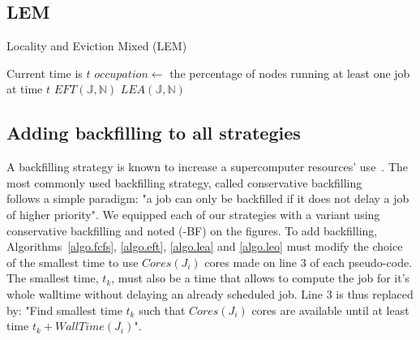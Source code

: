 \documentclass[conference,10pt]{IEEEtran}
\newcommand{\core}{\mathit{Cores}\xspace}
\newcommand{\walltime}{\mathit{WallTime}\xspace}
\newcommand{\jobset}{\ensuremath{\mathbb{J}}\xspace}
\newcommand{\nodeset}{\ensuremath{\mathbb{N}}\xspace}
\begin{document}
\subsection{LEM}

\begin{algorithm*}[htb]%
\caption{Locality and Eviction Mixed (LEM)}\label{algo.lem}
\begin{algorithmic}[1]
	\Statex Current time is $t$
		\State $occupation \gets$ the percentage of nodes running at least one job at time $t$
			\State $EFT(\jobset,\nodeset)$
		\Else
			\State $LEA(\jobset,\nodeset)$
		\EndIf
	\EndFor
\end{algorithmic}
\end{algorithm*}

\subsection{Adding backfilling to all strategies}

A backfilling strategy is known to increase
a supercomputer resources' use~\cite{maui}. 
The most commonly used backfilling strategy, called conservative 
backfilling~\cite{Characterization_of_Backfilling}~\cite{slurm_website_scheduling}~\cite{Introducing-New-Backfill-based} follows
a simple paradigm: "a job can only be backfilled if it does not
delay a job of higher priority".
We equipped each of our strategies with a variant using conservative backfilling and noted (-BF) on the figures.
To add backfilling, Algorithms~\ref{algo.fcfs}, \ref{algo.eft}, \ref{algo.lea} and \ref{algo.leo} must modify the choice of the smallest time to use $\core(J_i)$ cores made on line 3 of each pseudo-code.
The smallest time, $t_k$, must also be a time 
that allows to compute the job for it's whole walltime
without delaying an already scheduled job.
Line 3 is thus replaced by:
"Find smallest time $t_k$ such that $\core(J_i)$ cores are available until at least time $t_k + \walltime(J_i)$".
\end{document}
